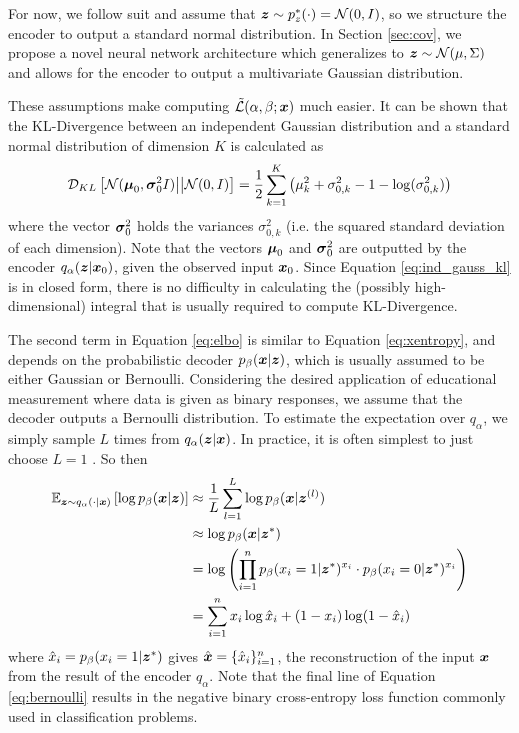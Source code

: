 For now, we follow suit and assume that $\boldsymbol{z} \sim p_z^*(\cdot) = \mathcal{N}(0,I)$, so we structure the encoder to output a standard normal distribution. In Section \ref{sec:cov}, we propose a novel neural network architecture which generalizes to $\boldsymbol{z} \sim \mathcal{N}(\mu, \Sigma)$ and allows for the encoder to output a multivariate Gaussian distribution.

These assumptions make computing $\tilde{\mathcal{L}}(\alpha,\beta;\boldsymbol{x})$ much easier. It can be shown \cite{doersch2016} that the KL-Divergence between an independent Gaussian distribution and a standard normal distribution of dimension $K$ is calculated as
\begin{equation}
  \mathcal{D}_{KL}\left[ \mathcal{N}(\boldsymbol{\mu}_0, \boldsymbol{\sigma}_0^2I) \big|\big| \mathcal{N}(0,I) \right] = \frac{1}{2}\sum_{k=1}^K \left( \mu_k^2 + \sigma_{0,k}^2 - 1 - \log(\sigma_{0,k}^2)\right)
  \label{eq:ind_gauss_kl}
\end{equation}
where the vector $\boldsymbol{\sigma}_0^2$ holds the variances $\sigma_{0,k}^2$ (i.e. the squared standard deviation of each dimension). Note that the vectors $\boldsymbol{\mu}_0$ and $\boldsymbol{\sigma}_0^2$ are outputted by the encoder $q_\alpha(\boldsymbol{z} | \boldsymbol{x}_0)$, given the observed input $\boldsymbol{x}_0$. Since Equation \ref{eq:ind_gauss_kl} is in closed form, there is no difficulty in calculating the (possibly high-dimensional) integral that is usually required to compute KL-Divergence.

The second term in Equation \ref{eq:elbo} is similar to Equation \ref{eq:xentropy}, and depends on the probabilistic decoder $p_\beta(\boldsymbol{x} | \boldsymbol{z})$, which is usually assumed to be either Gaussian or Bernoulli. Considering the desired application of educational measurement where data is given as binary responses, we assume that the decoder outputs a Bernoulli distribution. To estimate the expectation over $q_\alpha$, we simply sample $L$ times from $q_\alpha(\boldsymbol{z} | \boldsymbol{x})$. In practice, it is often simplest to just choose $L=1$ \cite{kingma2014}. So then 
\begin{equation}
  \begin{split}
    \mathbb{E}_{\boldsymbol{z} \sim q_\alpha(\cdot | \boldsymbol{x})} \left[ \log p_\beta(\boldsymbol{x} | \boldsymbol{z}) \right] &\approx \frac{1}{L}\sum_{l=1}^L \log p_\beta(\boldsymbol{x} | \boldsymbol{z}^{(l)}) \\
    &\approx \log p_\beta(\boldsymbol{x}| \boldsymbol{z}^*) \\
    &= \log\left( \prod_{i=1}^n p_\beta(x_i = 1 | \boldsymbol{z}^*)^{x_i} \cdot p_\beta(x_i=0 | \boldsymbol{z}^*)^{x_i} \right) \\
  &= \sum_{i=1}^n x_i\log \hat x_i + (1-x_i)\log (1-\hat x_i)
  \end{split}
  \label{eq:bernoulli}
\end{equation}
where $\hat x_i = p_\beta(x_i=1 | \boldsymbol{z}^*)$ gives $\hat{\boldsymbol{x}} = \{\hat x_i\}_{i=1}^n$, the reconstruction of the input $\boldsymbol{x}$ from the result of the encoder $q_\alpha$. Note that the final line of Equation \ref{eq:bernoulli} results in the negative binary cross-entropy loss function commonly used in classification problems.

